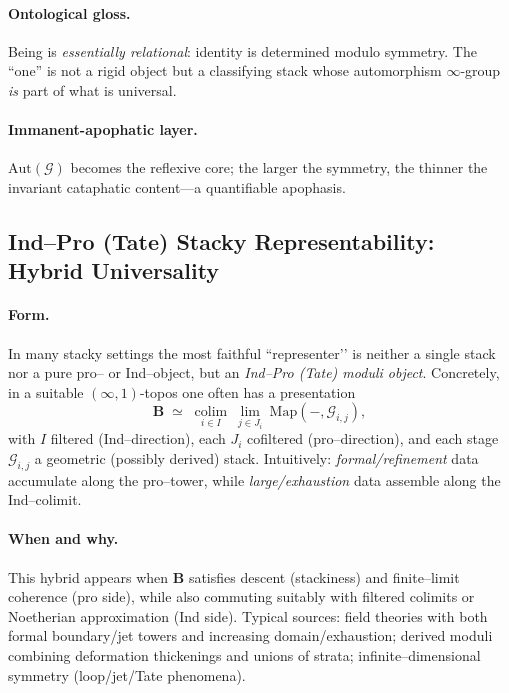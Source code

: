 \documentclass[11pt]{article}
\theoremstyle{upright}
\begin{document}
\paragraph{Ontological gloss.}
Being is \emph{essentially relational}: identity is determined modulo symmetry. The ``one'' is not a rigid object but a classifying stack whose automorphism $\infty$-group \emph{is} part of what is universal.

\paragraph{Immanent-apophatic layer.}
$\mathrm{Aut}(\mathcal G)$ becomes the reflexive core; the larger the symmetry, the thinner the invariant cataphatic content---a quantifiable apophasis.

\subsection{Ind–Pro (Tate) Stacky Representability: Hybrid Universality}\label{subsec:indpro-stacky}
\paragraph{Form.}
In many stacky settings the most faithful “representer’’ is neither a single stack nor a pure pro– or Ind–object, but an \emph{Ind–Pro (Tate) moduli object}. Concretely, in a suitable $(\infty,1)$\nobreakdash-topos one often has a presentation
\[
\mathbf B \;\simeq\; \operatorname*{colim}_{i\in I}\ \operatorname*{lim}_{j\in J_i}\ \mathrm{Map}(-,\mathcal G_{i,j}),
\]
with $I$ filtered (Ind–direction), each $J_i$ cofiltered (pro–direction), and each stage $\mathcal G_{i,j}$ a geometric (possibly derived) stack. Intuitively: \emph{formal/refinement} data accumulate along the pro–tower, while \emph{large/exhaustion} data assemble along the Ind–colimit.

\paragraph{When and why.}
This hybrid appears when $\mathbf B$ satisfies descent (stackiness) and finite–limit coherence (pro side), while also commuting suitably with filtered colimits or Noetherian approximation (Ind side). \citep{Rydh2015Noetherian} Typical sources: field theories with both formal boundary/jet towers and increasing domain/exhaustion; derived moduli combining deformation thickenings and unions of strata; infinite–dimensional symmetry (loop/jet/Tate phenomena).
\end{document}
